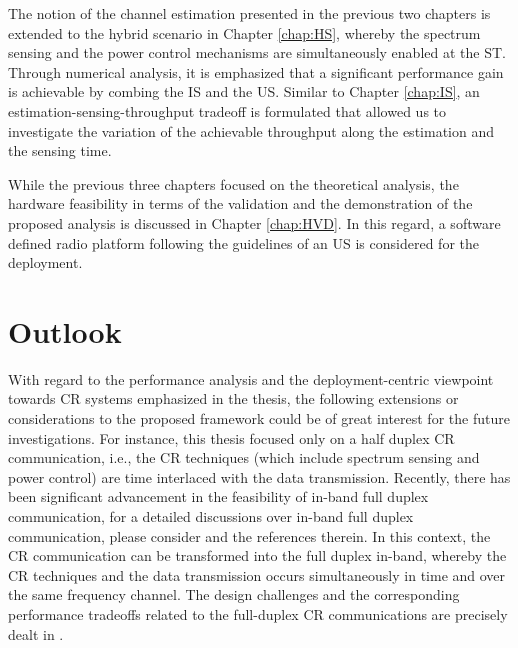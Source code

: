 The notion of the channel estimation presented in the previous two chapters is extended to the hybrid scenario in Chapter \ref{chap:HS}, whereby the spectrum sensing and the power control mechanisms are simultaneously enabled at the ST. Through numerical analysis, it is emphasized that a significant performance gain is achievable by combing the IS and the US. Similar to Chapter \ref{chap:IS}, an estimation-sensing-throughput tradeoff is formulated that allowed us to investigate the variation of the achievable throughput along the estimation and the sensing time. 

While the previous three chapters focused on the theoretical analysis, the hardware feasibility in terms of the validation and the demonstration of the proposed analysis is discussed in Chapter \ref{chap:HVD}. In this regard, a software defined radio platform following the guidelines of an US is considered for the deployment. 


\section{Outlook}
With regard to the performance analysis and the deployment-centric viewpoint towards CR systems emphasized in the thesis, the following extensions or considerations to the proposed framework could be of great interest for the future investigations. For instance, this thesis focused only on a half duplex CR communication, i.e., the CR techniques (which include spectrum sensing and power control) are time interlaced with the data transmission. Recently, there has been significant advancement in the feasibility of in-band full duplex communication, for a detailed discussions over in-band full duplex communication, please consider \cite{Bhar13, Sab14, Liu15} and the references therein. In this context, the CR communication can be transformed into the full duplex in-band, whereby the CR techniques and the data transmission occurs simultaneously in time and over the same frequency channel. The design challenges and the corresponding performance tradeoffs related to the full-duplex CR communications are precisely dealt in \cite{Liao15, Kim15}. 

